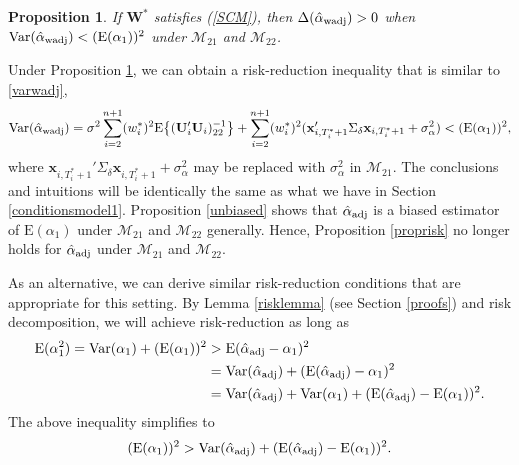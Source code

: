 \documentclass[11pt]{article}
\def\mbf#1{\mathbf{#1}} %
\def\mrm#1{\mathrm{#1}} %
\def\mc#1{\mathcal{#1}} %
\def\E#1{\mathrm{E}(#1)} %
\def\var#1{\mathrm{Var}(#1)} %
\newtheorem{prop}{Proposition}
\theoremstyle{definition}
\begin{document}
\begin{prop}
\label{propriskwadj2} If $\mbf{W}^*$ satisfies (\ref{SCM}), then $\Delta(\hat\alpha_{\rm wadj}) > 0$ when $\var{\hat{\alpha}_{\rm wadj}}<(\E{\alpha_1})^2$  under $\mc{M}_{21}$ and $\mc{M}_{22}$. 
\end{prop}
Under Proposition \ref{propriskwadj2}, we can obtain a risk-reduction inequality that is similar to \eqref{varwadj},
\begin{align*}
\var{\hat{\alpha}_{\rm wadj}}
 = \sigma^2\sum_{i=2}^{n+1}(w_i^*)^2\mrm{E}\big\{(\mbf{U}'_i\mbf{U}_i)^{-1}_{22}\big\} + \sum_{i=2}^{n+1} (w_i^*)^2 (\mbf{x}_{i, T_i^*+1}'\Sigma_{\delta}\mbf{x}_{i, T_i^*+1} + \sigma^2_{\alpha}) < (\E{\alpha_1})^2,
\end{align*}
where $\mbf{x}_{i, T_i^*+1}'\Sigma_{\delta}\mbf{x}_{i, T_i^*+1} + \sigma^2_{\alpha}$ may be replaced with $\sigma^2_{\alpha}$ in $\mc{M}_{21}$. The conclusions and intuitions will be identically the same as what we have in Section \ref{conditionsmodel1}. Proposition \ref{unbiased} shows that $\hat{\alpha}_{\rm adj}$ is a biased estimator of $\E{\alpha_1}$ under $\mc{M}_{21}$ and $\mc{M}_{22}$ generally. Hence, Proposition \ref{proprisk} no longer holds for $\hat{\alpha}_{\rm adj}$ under $\mc{M}_{21}$ and $\mc{M}_{22}$.

As an alternative, we can derive similar risk-reduction conditions that are appropriate for this setting. By Lemma \ref{risklemma} (see Section \ref{proofs}) and risk decomposition, we will achieve risk-reduction as long as
\begin{align*}
 \E{\alpha_1^2}= \var{\alpha_1}+(\E{\alpha_1})^2
 &>\E{\hat{\alpha}_{\rm adj}-\alpha_1}^2\\
  &=\var{\hat{\alpha}_{\rm adj}} +  (\E{\hat{\alpha}_{\rm adj}}-\alpha_1)^2 \\
  &=\var{\hat{\alpha}_{\rm adj}} +  \var{\alpha_1} + (\E{\hat{\alpha}_{\rm adj}}-\E{\alpha_1})^2.
\end{align*}
The above inequality simplifies to 
\begin{equation} \label{ineq}
 (\E{\alpha_1})^2 >\var{\hat{\alpha}_{\rm adj}}+ (\E{\hat{\alpha}_{\rm adj}}-\E{\alpha_1})^2.
\end{equation}

\end{document}
